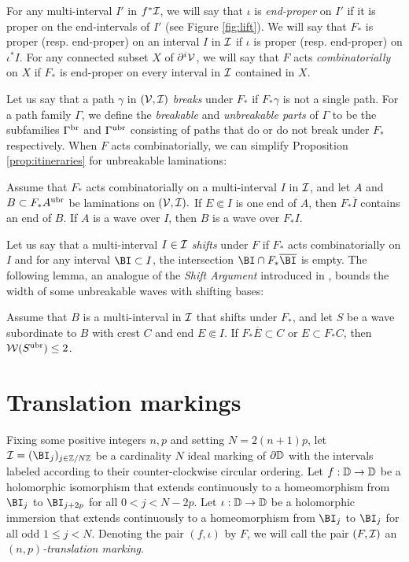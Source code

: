 \documentclass[12pt]{amsart}
\begin{document}
For any multi-interval $I'$ in $f^*\mathcal I$, we will say that $\iota$ is \textit{end-proper} on $I'$ if it is proper on the end-intervals of $I'$ (see Figure \ref{fig:lift}).
We will say that $F_*$ is proper (resp. end-proper) on an interval $I$ in $\mathcal I$ if $\iota$ is proper (resp. end-proper) on $\iota^*I$.
For any connected subset $X$ of $\partial^i \mathcal V$, we will say that $F$ acts \textit{combinatorially} on $X$ if $F_*$ is end-proper on every interval in $\mathcal I$ contained in $X$. 

Let us say that a path $\gamma$ in $(\mathcal V, \mathcal I)$ \textit{breaks} under $F_*$ if $F_*\gamma$ is not a single path. 
For a path family $\Gamma$, we define the \textit{breakable} and \textit{unbreakable parts} of $\Gamma$ to be the subfamilies $\Gamma^{\mathrm{br}}$ and $\Gamma^{\mathrm{ubr}}$ consisting  of paths  that do or do not break under $F_*$ respectively. 
When $F$ acts combinatorially, we can  simplify Proposition \ref{prop:itineraries} for unbreakable laminations:
\begin{prop}\label{prop:nonbreaking}
    Assume that $F_*$ acts combinatorially on a multi-interval $I$ in $\mathcal I$, and
    let $A$ and $B\subset F_*A^{\mathrm{ubr}}$ be laminations on $(\mathcal V, \mathcal I).$
    If $E\Subset I$ is one end of $A$, then $F_*\overline I$ contains an end of  $B$. If $A$ is a wave over  $I$, then $B$ is a wave over $F_*I$.
\end{prop}


Let us say that a multi-interval $I\in \mathcal I$ \textit{shifts} under $F$ if $F_*$ acts combinatorially on $I$ and for any 
interval $\BI\subset I$, the intersection $\BI\cap F_*\overline\BI$ is empty. The following lemma, an analogue of the \textit{Shift Argument} introduced in \cite[A.3]{DLneutral}
\cite{dudko2023mlcfeigenbaumpoints}, bounds the width of some unbreakable waves with shifting bases:

\begin{lemma}\label{lem:shift}
    Assume that $B$ is a multi-interval in $\mathcal I$ that shifts under $F_*$, and let $S$ be a wave subordinate to $B$ with crest $C$ and end $E\Subset I$. 
     If $ F_*\overline E\subset C$ or $E\subset F_*C$, then $\mathcal W(S^{\mathrm{ubr}})\leq 2$.
\end{lemma}



\section{Translation markings} \label{app:transl-mark}


Fixing some positive integers $n, p$ and setting $N = 2(n+1)p$, let $\II = (\BI_j)_{j\in \Z/N\Z}$ be a cardinality $N$ ideal marking of $\partial \mathbb D$ with the intervals labeled according to their counter-clockwise circular ordering. 
Let $f: \mathbb D\to \mathbb D$ be a holomorphic isomorphism that extends continuously to a homeomorphism from $\BI_j$ to $\BI_{j+2p}$ for all $0 < j < N-2p$. Let $\iota: \mathbb D\to \mathbb D$ be a holomorphic immersion that extends continuously to a  homeomorphism from $\BI_j$ to $\BI_j$ for all odd $1\leq j < N$. 
Denoting the pair $(f, \iota)$ by $F$, we will call the pair $(F, \mathcal I)$ an \textit{$(n, p)$-translation marking}. 
\end{document}
